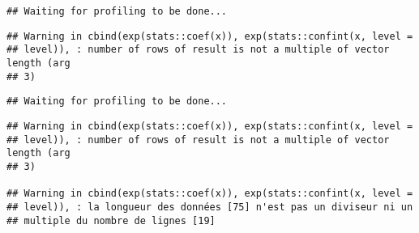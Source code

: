 \documentclass[]{article}
\newenvironment{Shaded}{\begin{snugshade}}{\end{snugshade}}
\newcommand{\KeywordTok}[1]{\textcolor[rgb]{0.13,0.29,0.53}{\textbf{#1}}}
\newcommand{\DataTypeTok}[1]{\textcolor[rgb]{0.13,0.29,0.53}{#1}}
\newcommand{\StringTok}[1]{\textcolor[rgb]{0.31,0.60,0.02}{#1}}
\newcommand{\OperatorTok}[1]{\textcolor[rgb]{0.81,0.36,0.00}{\textbf{#1}}}
\newcommand{\NormalTok}[1]{#1}
\begin{document}
\begin{verbatim}
## Waiting for profiling to be done...
\end{verbatim}

\begin{verbatim}
## Warning in cbind(exp(stats::coef(x)), exp(stats::confint(x, level =
## level)), : number of rows of result is not a multiple of vector length (arg
## 3)
\end{verbatim}

\begin{verbatim}
## Waiting for profiling to be done...
\end{verbatim}

\begin{verbatim}
## Warning in cbind(exp(stats::coef(x)), exp(stats::confint(x, level =
## level)), : number of rows of result is not a multiple of vector length (arg
## 3)

## Warning in cbind(exp(stats::coef(x)), exp(stats::confint(x, level =
## level)), : la longueur des données [75] n'est pas un diviseur ni un
## multiple du nombre de lignes [19]
\end{verbatim}

\begin{Shaded}
\end{Shaded}
\end{document}
